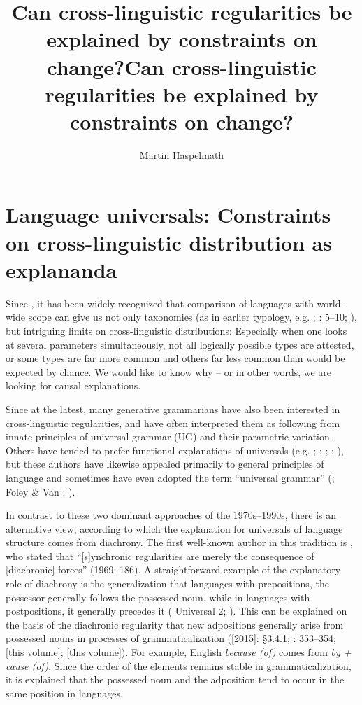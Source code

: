 \documentclass[output=paper]{langsci/langscibook}
\author{Martin Haspelmath\affiliation{MPI-SHH Jena \& Leipzig University}}
\title{Can cross-linguistic regularities be explained by constraints on change?}
\begin{document}
\maketitle 

\title{{Can cross-linguistic} regularities be explained by constraints on change?}

 
 

\section{Language universals: Constraints on cross-linguistic distribution as explananda}

Since \citet{Greenberg1963}, it has been widely recognized that comparison of languages with world-wide scope can give us not only taxonomies (as in earlier typology, e.g. \citealt{Schlegel1808}; \citealt{Schleicher1850}: 5–10; \citealt{Sapir1921}), but intriguing limits on cross-linguistic distributions: Especially when one looks at several parameters simultaneously, not all logically possible types are attested, or some types are far more common and others far less common than would be expected by chance. We would like to know why – or in other words, we are looking for causal explanations.

Since \citet{Chomsky1981} at the latest, many generative grammarians have also been interested in cross-linguistic regularities, and have often interpreted them as following from innate principles of universal grammar (UG) and their parametric variation. Others have tended to prefer functional explanations of universals (e.g. \citealt{Comrie1989}; \citealt{Stassen1985}; \citealt{Dixon1994}; \citealt{Dik1997}; \citealt{Hawkins2014}), but these authors have likewise appealed primarily to general principles of language and sometimes have even adopted the term “universal grammar” (\citealt{KeenanComrie1977}; Foley \& Van \citealt{Valin1984}; \citealt{Stassen1985}).

In contrast to these two dominant approaches of the 1970s–1990s, there is an alternative view, according to which the explanation for universals of language structure comes from diachrony. The first well-known author in this tradition is \citet{Greenberg1969}, who stated that “[s]ynchronic regularities are merely the consequence of [diachronic] forces” (1969: 186). A straightforward example of the explanatory role of diachrony is the generalization that languages with prepositions, the possessor generally follows the possessed noun, while in languages with postpositions, it generally precedes it ( Universal 2; \citealt{Dryer1992}). This can be explained on the basis of the diachronic regularity that new adpositions generally arise from possessed nouns in processes of grammaticalization (\citealt{Lehmann1982}[2015]: §3.4.1; \citealt{Bybee1988}: 353–354; \citealt{Collins2018} [this volume]; \citealt{Dryer2018} [this volume]). For example, English \textit{because (of)} comes from \textit{by + cause (of)}. Since the order of the elements remains stable in grammaticalization, it is explained that the possessed noun and the adposition tend to occur in the same position in languages.
\end{document}
